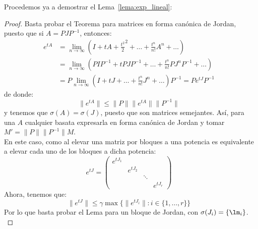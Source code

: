 \noindent
Procedemos ya a demostrar el Lema~\ref{lema:exp_lineal}:
\begin{proof}
    Basta probar el Teorema para matrices en forma canónica de Jordan, puesto que si $A = PJP^{-1}$, entonces:
    \begin{align*}
        e^{tA} &= \lim_{n\to\infty} \left(I + tA + \frac{t^2}{2}^2 + \ldots + \frac{t^n}{n!}A^n + \ldots\right) \\
               &= \lim_{n\to\infty} \left(PIP^{-1} + tPJP^{-1} + \ldots + \frac{t^n}{n!}PJ^nP^{-1} + \ldots\right) \\
               &= P\lim_{n\to\infty}\left(I + tJ + \ldots + \frac{t^n}{n!}J^n + \ldots\right) P^{-1} =  Pe^{tJ}P^{-1}
    \end{align*}
    de donde:
    \begin{equation*}
        \|e^{tA}\| \leq \|P\|\|e^{tA}\|\|P^{-1}\|
    \end{equation*}
    y tenemos que $\sigma(A) = \sigma(J)$, puesto que son matrices semejantes. Así, para una $A$ cualquier basata expresarla en forma canónica de Jordan y tomar $M' = \|P\|\|P^{-1}\|M$.\\

    \noindent
    En este caso, como al elevar una matriz por bloques a una potencia es equivalente a elevar cada uno de los bloques a dicha potencia:
    \begin{equation*}
        e^{tJ} = \left(\begin{array}{cccc}
            e^{tJ_1} &  &  &  \\
             & e^{tJ_2} &  &  \\
             &  & \ddots &  \\
             &  &  &  e^{tJ_r}
        \end{array}\right)
    \end{equation*}
    Ahora, tenemos que:
    \begin{equation*}
        \|e^{tJ}\| \leq \gamma\max\{\|e^{tJ_i}\|: i \in \{1,\ldots,r\}\}
    \end{equation*}
    Por lo que basta probar el Lema para un bloque de Jordan, con $\sigma(J_i) = \{\lm_i\}$.\\


\end{proof}
